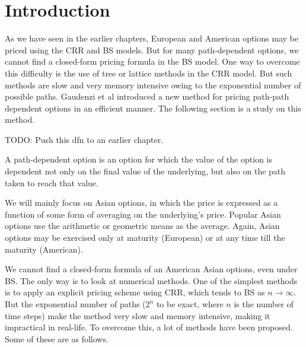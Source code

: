 \section{Introduction}
\label{sec:intro}
As we have seen in the earlier chapters, European and American options may be priced using the CRR and BS models. But for many path-dependent options, we cannot find a closed-form pricing formula in the BS model. One way to overcome this difficulty is the use of tree or lattice methods in the CRR model. But such methods are slow and very memory intensive owing to the exponential  number of possible paths. Gaudenzi et al\cite{Gaudenzi2010} introduced a new method for pricing path-path dependent options in an efficient manner. The following section is a study on this method.

TODO: Push this dfn to an earlier chapter.
\begin{dfn}
	A path-dependent option is an option for which the value of the option is dependent not only on the final value of the underlying, but also on the path taken to reach that value.
\end{dfn}

We will mainly focus on Asian options, in which the price is expressed as a function of some form of averaging on the underlying's price. Popular Asian options use the arithmetic or geometric means as the average. Again, Asian options may be exercised only at maturity (European) or at any time till the maturity (American).

We cannot find a closed-form formula of an American Asian options, even under BS. The only way is to look at numerical methods. One of the simplest methods is to apply an explicit pricing scheme using CRR, which tends to BS as $ n \to \infty $. But the exponential number of paths ($2^n$ to be exact, where $n$ is the number of time steps) make the method very slow and memory intensive, making it impractical in real-life. To overcome this, a lot of methods have been proposed. Some of these are as follows.


